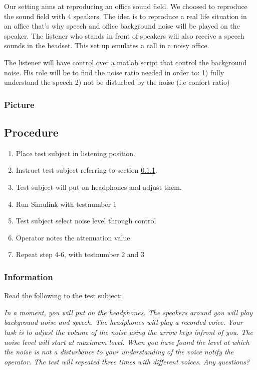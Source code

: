 Our setting aims at reproducing an office sound field. We choosed to reproduce the sound field with 4 speakers. 
The idea is to reproduce a real life situation in an office that's why speech and office background noise will be played on the speaker. 
The listener who stands in front of speakers will also receive a speech sounds in the headset. This set up emulates a call in a noisy office.

The listener will have control over a matlab script that control the background noise. His role will be to find the noise ratio needed in order to: 1) fully understand the speech 2) not be disturbed by the noise (i.e confort ratio)

\subsubsection{Picture}
\vspace{1cm}
\subsection{Procedure}

\begin{enumerate}
	\item Place test subject in listening position.
	\item Instruct test subject referring to section \ref{subsubsec:attenuationInformation}.
	\item Test subject will put on headphones and adjust them.
	\item Run Simulink  with testnumber 1
	\item Test subject select noise level through control
	\item Operator notes the attenuation value
	\item Repeat step 4-6, with testnumber 2 and 3
\end{enumerate}

\subsubsection{Information}\label{subsubsec:attenuationInformation}
Read the following to the test subject:

\textit{In a moment, you will put on the headphones. The speakers around you will play background noise and speech. The headphones will play a recorded voice. Your task is to adjust the volume of the noise using the arrow keys infront of you. The noise level will start at maximum level. When you have found the level at which the noise is not a disturbance to your understanding of the voice notify the operator. The test will repeated three times with different voices. Any questions?}


